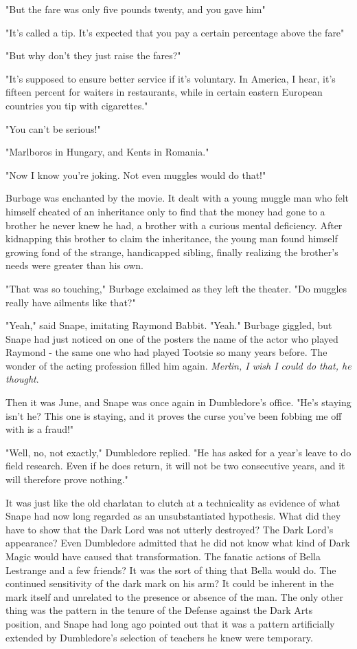 "But the fare was only five pounds twenty, and you gave him{\el}"

"It's called a tip. It's expected that you pay a certain percentage above the fare{\el}"

"But why don't they just raise the fares?"

"It's supposed to ensure better service if it's voluntary. In America, I hear, it's fifteen percent for waiters in restaurants, while in certain eastern European countries you tip with cigarettes."

"You can't be serious!"

"Marlboros in Hungary, and Kents in Romania."

"Now I know you're joking. Not even muggles would do that!"

Burbage was enchanted by the movie. It dealt with a young muggle man who felt himself cheated of an inheritance only to find that the money had gone to a brother he never knew he had, a brother with a curious mental deficiency. After kidnapping this brother to claim the inheritance, the young man found himself growing fond of the strange, handicapped sibling, finally realizing the brother's needs were greater than his own.

"That was so touching," Burbage exclaimed as they left the theater. "Do muggles really have ailments like that?"

"Yeah," said Snape, imitating Raymond Babbit. "Yeah." Burbage giggled, but Snape had just noticed on one of the posters the name of the actor who played Raymond - the same one who had played Tootsie so many years before. The wonder of the acting profession filled him again. \emph{Merlin, I wish I could do that, he thought}.

Then it was June, and Snape was once again in Dumbledore's office. "He's staying isn't he? This one is staying, and it proves the curse you've been fobbing me off with is a fraud!"

"Well, no, not exactly," Dumbledore replied. "He has asked for a year's leave to do field research. Even if he does return, it will not be two consecutive years, and it will therefore prove nothing."

It was just like the old charlatan to clutch at a technicality as evidence of what Snape had now long regarded as an unsubstantiated hypothesis. What did they have to show that the Dark Lord was not utterly destroyed? The Dark Lord's appearance? Even Dumbledore admitted that he did not know what kind of Dark Magic would have caused that transformation. The fanatic actions of Bella Lestrange and a few friends? It was the sort of thing that Bella would do. The continued sensitivity of the dark mark on his arm? It could be inherent in the mark itself and unrelated to the presence or absence of the man. The only other thing was the pattern in the tenure of the Defense against the Dark Arts position, and Snape had long ago pointed out that it was a pattern artificially extended by Dumbledore's selection of teachers he knew were temporary.

